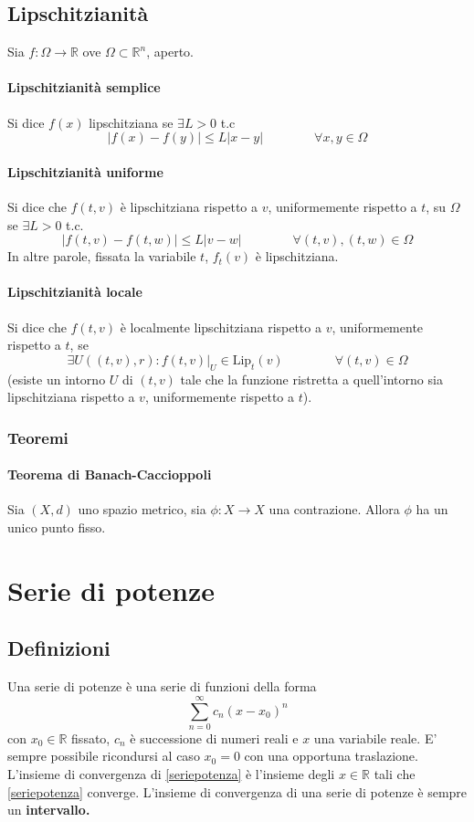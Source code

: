 \documentclass[a4paper,12pt]{article}
\begin{document}
\subsection{Lipschitzianità}
Sia $f:\Omega\rightarrow\mathbb{R}$ ove $\Omega\subset\mathbb{R}^n$, aperto.
\paragraph{Lipschitzianità semplice}
Si dice $f\left(x\right)$ lipschitziana se $\exists L>0$ t.c
$$ |f\left(x\right)- f\left(y\right)| \leq L|x-y|\qquad\qquad\forall x,y \in \Omega $$

\paragraph{Lipschitzianità uniforme}
Si dice che $f(t, v)$ è lipschitziana rispetto a $v$, uniformemente rispetto a $t$, su $\Omega$ se $\exists L>0$ t.c.
$$|f(t, v) - f(t, w)| \leq L|v-w|\qquad\qquad\forall (t,v), (t, w) \in \Omega$$
In altre parole, fissata la variabile $t$, $f_t(v)$ è lipschitziana.

\paragraph{Lipschitzianità locale}
Si dice che $f(t, v)$ è localmente lipschitziana rispetto a $v$, uniformemente rispetto a $t$, se
$$\exists U((t, v), r) : f(t, v)|_U \in \text{Lip}_t(v)\qquad\qquad\forall(t, v)\in \Omega$$
(esiste un intorno $U$ di $(t, v)$ tale che la funzione ristretta a quell'intorno sia lipschitziana rispetto a $v$, uniformemente rispetto a $t$).

\subsubsection{Teoremi}
\paragraph{Teorema di Banach-Caccioppoli}
Sia $(X, d)$ uno spazio metrico, sia $\phi : X\rightarrow X$ una contrazione.
Allora $\phi$ ha un unico punto fisso.

\section{Serie di potenze}
\subsection{Definizioni}
Una serie di potenze è una serie di funzioni della forma
$$\label{seriepotenza} \displaystyle \sum_{n=0}^\infty c_n\left(x-x_0\right)^n$$
con $x_0 \in \mathbb{R}$ fissato, ${c_n}$ è successione di numeri reali e $x$ una variabile reale. 
E' sempre possibile ricondursi al caso $x_0 = 0$ con una opportuna traslazione. L'insieme di convergenza di \ref{seriepotenza} è l'insieme degli $x \in \mathbb{R}$ tali che \ref{seriepotenza} converge. L'insieme di convergenza di una serie di potenze è sempre un \textbf{intervallo.}
\end{document}
